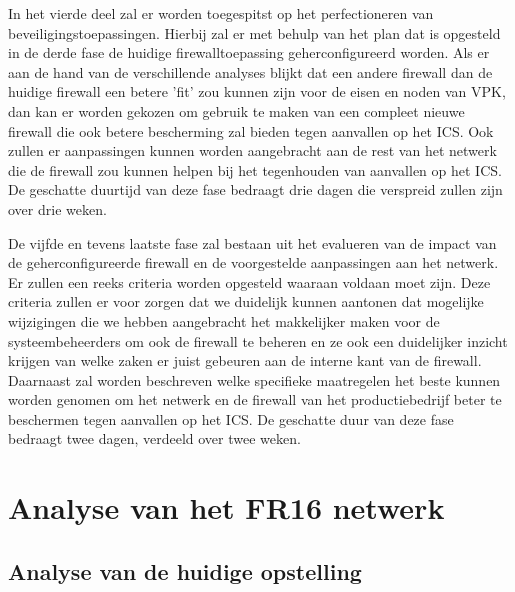 In het vierde deel zal er worden toegespitst op het perfectioneren van beveiligingstoepassingen. Hierbij zal er met behulp van het plan dat is opgesteld in de derde fase de huidige firewalltoepassing geherconfigureerd worden. Als er aan de hand van de verschillende analyses blijkt dat een andere firewall dan de huidige firewall een betere 'fit' zou kunnen zijn voor de eisen en noden van VPK, dan kan er worden gekozen om gebruik te maken van een compleet nieuwe firewall die ook betere bescherming zal bieden tegen aanvallen op het ICS. Ook zullen er aanpassingen kunnen worden aangebracht aan de rest van het netwerk die de firewall zou kunnen helpen bij het tegenhouden van aanvallen op het ICS. De geschatte duurtijd van deze fase bedraagt drie dagen die verspreid zullen zijn over drie weken.

De vijfde en tevens laatste fase zal bestaan uit het evalueren van de impact van de geherconfigureerde firewall en de voorgestelde aanpassingen aan het netwerk. Er zullen een reeks criteria worden opgesteld waaraan voldaan moet zijn. Deze criteria zullen er voor zorgen dat we duidelijk kunnen aantonen dat mogelijke wijzigingen die we hebben aangebracht het makkelijker maken voor de systeembeheerders om ook de firewall te beheren en ze ook een duidelijker inzicht krijgen van welke zaken er juist gebeuren aan de interne kant van de firewall. Daarnaast zal worden beschreven welke specifieke maatregelen het beste kunnen worden genomen om het netwerk en de firewall van het productiebedrijf beter te beschermen tegen aanvallen op het ICS. De geschatte duur van deze fase bedraagt twee dagen, verdeeld over twee weken.  

\chapter{Analyse van het FR16 netwerk}

\label{ch:onderzoek}

\section{Analyse van de huidige opstelling}

